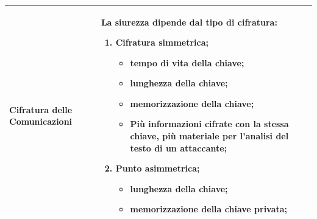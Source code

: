 \documentclass[12pt,a4paper]{report}
\begin{document}
\begin{tabularx}{\textwidth}{|X|X|}
    Cifratura delle Comunicazioni & 
                La siurezza dipende dal tipo di cifratura:
                \begin{enumerate}[nosep, leftmargin=*]
                    \item Cifratura simmetrica;
                    \begin{itemize}
                        \item tempo di vita della chiave;
                        \item lunghezza della chiave;
                        \item memorizzazione della chiave;
                        \item Più informazioni cifrate con la stessa chiave, più materiale per l'analisi del testo di un attaccante;
                    \end{itemize}
                    \item Punto asimmetrica;
                    \begin{itemize}
                        \item lunghezza della chiave;
                        \item memorizzazione della chiave privata;
                    \end{itemize}
                \end{enumerate} \\ \hline
\end{tabularx}
\end{document}
